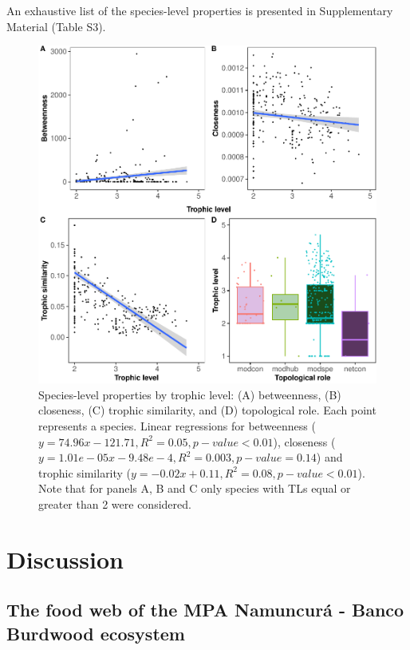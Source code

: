 \documentclass[preprint, 3p,
authoryear]{elsarticle} %
\begin{document}
An exhaustive list of the species-level properties is presented in
Supplementary Material (Table S3).

\begin{figure}

{\centering \includegraphics{MS_Burdwood_foodweb_files/figure-latex/figure4-1} 

}

\caption{Species-level properties by trophic level: (A) betweenness, (B) closeness, (C) trophic similarity, and (D) topological role. Each point represents a species. Linear regressions for betweenness ($y = 74.96x - 121.71, R^2 = 0.05, p-value < 0.01$), closeness ($y = 1.01e-05x - 9.48e-4, R^2 = 0.003, p-value = 0.14$) and trophic similarity ($y = -0.02x + 0.11 , R^2 = 0.08, p-value < 0.01$). Note that for panels A, B and C only species with TLs equal or greater than 2 were considered.}\label{fig:figure4}
\end{figure}

\hypertarget{discussion}{%
\section{Discussion}\label{discussion}}

\hypertarget{the-food-web-of-the-mpa-namuncuruxe1---banco-burdwood-ecosystem}{%
\subsection{The food web of the MPA Namuncurá - Banco Burdwood
ecosystem}\label{the-food-web-of-the-mpa-namuncuruxe1---banco-burdwood-ecosystem}}
\end{document}

